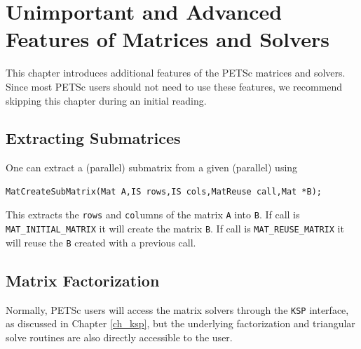 {{%

\cleardoublepage
\chapter{Unimportant and Advanced Features of Matrices and Solvers}
\label{ch_advanced}

This chapter introduces additional features of the PETSc matrices and solvers.
Since most PETSc users should not need to use these features,
we recommend skipping this chapter during an initial reading.

\medskip \medskip

\section{Extracting Submatrices} 

One can extract a (parallel) submatrix from a given (parallel) using
\begin{lstlisting}
MatCreateSubMatrix(Mat A,IS rows,IS cols,MatReuse call,Mat *B);
\end{lstlisting}
This extracts the \lstinline{rows} and \lstinline{col}umns of the matrix \lstinline{A} into \lstinline{B}. If
call is  \lstinline{MAT_INITIAL_MATRIX}  it will create the matrix
\lstinline{B}. If call is \lstinline{MAT_REUSE_MATRIX}  it will reuse the \lstinline{B}
created with a previous call.

\medskip \medskip

\section{Matrix Factorization} 
\label{sec_matfactor}

Normally, PETSc users will access the matrix solvers through the
\lstinline{KSP} interface, as discussed in Chapter \ref{ch_ksp}, but the underlying
factorization and triangular solve routines are also directly
accessible to the user.

\medskip \medskip

}}
